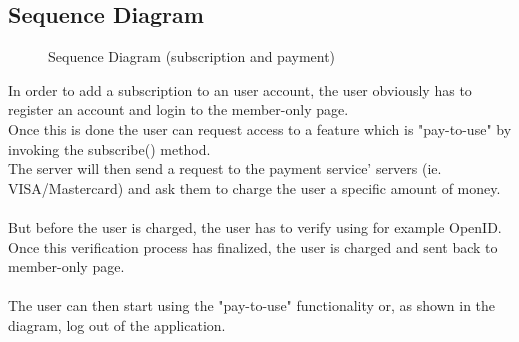\subsection{Sequence Diagram}
\begin{figure}[H]

\caption{Sequence Diagram (subscription and payment)}
\end{figure}

In order to add a subscription to an user account, the user obviously has to register an account and login to the member-only page.\\
Once this is done the user can request access to a feature which is "pay-to-use" by invoking the subscribe() method.\\
The server will then send a request to the payment service' servers (ie. VISA/Mastercard) and ask them to charge the user a specific amount of money.\\
\\
But before the user is charged, the user has to verify using for example OpenID.
Once this verification process has finalized, the user is charged and sent back to member-only page.\\
\\
The user can then start using the "pay-to-use" functionality or, as shown in the diagram, log out of the application.